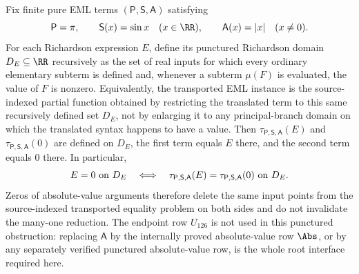 \begin{theorem}
\label{thm:punctured-domain-richardson-reduction}
\label{thm:richardson-punctured-domain-convention}
Fix finite pure EML terms \((\mathsf P,\mathsf S,\mathsf A)\) satisfying
\[
  \mathsf P=\pi,
  \qquad \mathsf S(x)=\sin x\quad(x\in\RR),
  \qquad \mathsf A(x)=|x|\quad(x\ne0).
\]
For each Richardson expression \(E\), define its punctured Richardson domain
\(D_E\subseteq\RR\) recursively as the set of real inputs for which every
ordinary elementary subterm is defined and, whenever a subterm \(\mu(F)\) is
evaluated, the value of \(F\) is nonzero.  Equivalently, the transported EML
instance is the source-indexed partial function obtained by restricting the
translated term to this same recursively defined set \(D_E\), not by enlarging it
to any principal-branch domain on which the translated syntax happens to have a
value.  Then
\(\tau_{\mathsf P,\mathsf S,\mathsf A}(E)\) and
\(\tau_{\mathsf P,\mathsf S,\mathsf A}(0)\) are defined on \(D_E\), the first term
equals \(E\) there, and the second term equals \(0\) there.  In particular,
\[
  E=0\hbox{ on }D_E
  \quad\Longleftrightarrow\quad
  \tau_{\mathsf P,\mathsf S,\mathsf A}(E)=
  \tau_{\mathsf P,\mathsf S,\mathsf A}(0)
  \hbox{ on }D_E .
\]
Zeros of absolute-value arguments therefore delete the same input points from the
source-indexed transported equality problem on both sides and do not invalidate
the many-one reduction.  The endpoint row \(U_{126}\) is not used in this
punctured obstruction: replacing \(\mathsf A\) by the internally proved
absolute-value row \(\Abs\), or by any separately verified punctured
absolute-value row, is the whole root interface required here.
\end{theorem}

